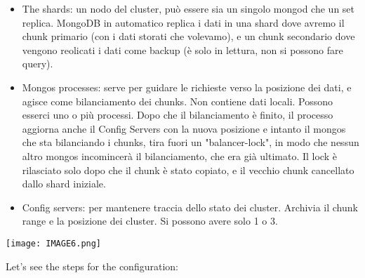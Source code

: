 \documentclass[a4page, 11pt]{article}
\begin{document}
\begin{itemize}[noitemsep]
	\item The shards: un nodo del cluster, può essere sia un singolo mongod che un set replica. MongoDB in automatico replica i dati in una shard dove avremo il chunk primario (con i dati storati che volevamo), e un chunk secondario dove vengono reolicati i dati come backup (è solo in lettura, non si possono fare query).
	\item Mongos processes: serve per guidare le richieste verso la posizione dei dati, e agisce come bilanciamento dei chunks. Non contiene dati locali. Possono esserci uno o più processi. Dopo che il bilanciamento è finito, il processo aggiorna anche il Config Servers con la nuova posizione e intanto il mongos che sta bilanciando i chunks, tira fuori un "balancer-lock", in modo che nessun altro mongos incomincerà il bilanciamento, che era già ultimato. Il lock è rilasciato solo dopo che il chunk è stato copiato, e il vecchio chunk cancellato dallo shard iniziale.
	\item Config servers: per mantenere traccia dello stato dei cluster. Archivia il chunk range e la posizione dei cluster. Si possono avere solo 1 o 3.
\end{itemize}

\begin{center}
	\texttt{[image: IMAGE6.png]}
\end{center}


Let's see the steps for the configuration:
\end{document}
